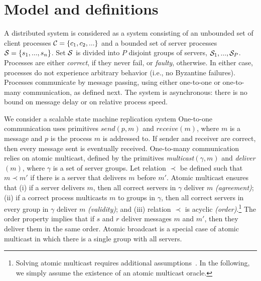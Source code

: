 \section{Model and definitions}

A distributed system is considered as a system consisting of an unbounded set of client processes $\mathcal{C} = \{c_1, c_2, ...\}$ and a bounded set of server processes $\mathcal{S} = \{s_1, ..., s_n\}$. Set $\mathcal{S}$ is divided into $P$ disjoint groups of servers, $\mathcal{S}_1, ..., \mathcal{S}_P$. 
Processes are either \emph{correct}, if they never fail, or \emph{faulty}, otherwise. 
In either case, processes do not experience arbitrary behavior (i.e., no Byzantine failures).
Processes communicate by message passing, using either one-to-one or one-to-many communication, as defined next.
The system is asynchronous: there is no bound on message delay or on relative process speed.

We consider a scalable state machine replication system 
One-to-one communication uses primitives $send(p,m)$ and $receive(m)$, where $m$ is a message and $p$ is the process $m$ is addressed to. 
If sender and receiver are correct, then every message sent is eventually received. 
%
One-to-many communication relies on atomic multicast, defined by the primitives \emph{multicast}$(\gamma, m)$ and \emph{deliver}$(m)$, where $\gamma$ is a set of server groups.
%
Let relation $\prec$ be defined such that $m \prec m'$ if there is a server that delivers $m$ before $m'$.
Atomic multicast ensures that 
(i) if a server delivers $m$, then all correct servers in $\gamma$ deliver $m$ \emph{(agreement)};
(ii) if a correct process multicasts $m$ to groups in $\gamma$, then all correct servers in every group in $\gamma$ deliver $m$ \emph{(validity)}; and
(iii) relation $\prec$ is acyclic \emph{(order)}.\footnote{Solving atomic multicast requires additional assumptions~\cite{CT96,FLP85}. In the following, we simply assume the existence of an atomic multicast oracle.}
The order property implies that if $s$ and $r$ deliver messages $m$ and $m'$, then they deliver them in the same order. 
Atomic broadcast is a special case of atomic multicast in which there is a single group with all servers.